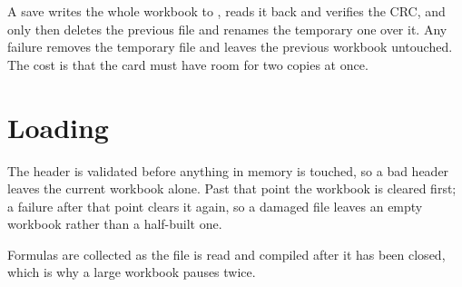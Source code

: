 A save writes the whole workbook to , reads it back and
verifies the CRC, and only then deletes the previous file and renames the
temporary one over it. Any failure removes the temporary file and leaves the
previous workbook untouched. The cost is that the card must have room for two
copies at once.

\section{Loading}

The header is validated before anything in memory is touched, so a bad header
leaves the current workbook alone. Past that point the workbook is cleared
first; a failure after that point clears it again, so a damaged file leaves an
empty workbook rather than a half-built one.

Formulas are collected as the file is read and compiled after it has been
closed, which is why a large workbook pauses twice.
